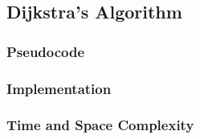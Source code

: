 \subsection{Dijkstra's Algorithm}

\subsubsection{Pseudocode}

\subsubsection{Implementation}

\subsubsection{Time and Space Complexity}

